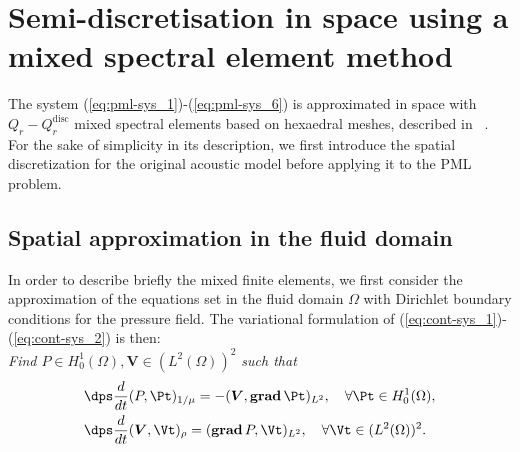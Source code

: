 \documentclass[a4paper]{article}
\def\grad{\mathop{\boldsymbol{\mathrm{grad}}}\nolimits}
\def\bV{\boldsymbol{V}}
\def\disc{\mathrm{disc}}
\begin{document}
\section{Semi-discretisation in space using a mixed spectral element method}
\label{sec:approx-space}
The system (\ref{eq:pml-sys_1})-(\ref{eq:pml-sys_6}) is approximated in space 
with   
$Q_r-Q_r^{\disc}$ 
mixed spectral elements based on hexaedral meshes, described in~%
\cite{cohen-fauq:00,fauqueux}. For the sake of simplicity in its 
description, we first introduce the spatial discretization for the 
original acoustic model before applying it to the PML problem.

\subsection{Spatial approximation in the fluid domain}
In order to describe briefly the mixed finite elements, we first
consider the approximation of the equations set in the fluid domain $\Omega$
with Dirichlet boundary conditions for the pressure field. The variational
formulation of (\ref{eq:cont-sys_1})-(\ref{eq:cont-sys_2}) is then: \\
{\it Find $P \in H^1_0(\Omega), \bV \in (L^2(\Omega))^2$ such that}
\begin{align*}
&\dps \frac{d}{dt} (P,\Pt)_{1/\mu}= - ( \bV, \grad \Pt)_{L^2}, 
\quad   \forall \Pt \in H^1_0(\Omega), \\
& \dps \frac{d}{dt}(\bV, \Vt )_{\rho} =(\grad P,  \Vt)_{L^2}, 
\quad \forall \Vt \in (L^2(\Omega))^2.
\end{align*}
\end{document}
